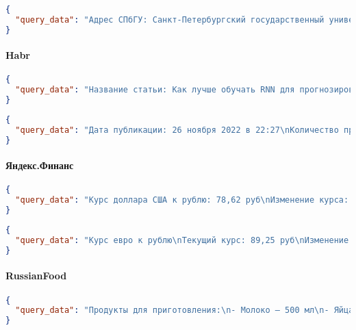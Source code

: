 \begin{lstlisting}[language=json,breaklines,keepspaces]
{
  "query_data": "Адрес СПбГУ: Санкт-Петербургский государственный университет, 199034, Россия, Санкт-Петербург, Университетская набережная, д. 7–9\n"
}
\end{lstlisting}

\paragraph{Habr}
\begin{lstlisting}[language=json,breaklines,keepspaces]
{
  "query_data": "Название статьи: Как лучше обучать RNN для прогнозирования временных рядов?\nАвтор: Lev_Perla\n"
}
\end{lstlisting}

\begin{lstlisting}[language=json,breaklines,keepspaces]
{
  "query_data": "Дата публикации: 26 ноября 2022 в 22:27\nКоличество просмотров: 22842\n"
}
\end{lstlisting}

\paragraph{Яндекс.Финанс}
\begin{lstlisting}[language=json,breaklines,keepspaces]
{
  "query_data": "Курс доллара США к рублю: 78,62 руб\nИзменение курса: Цена опустилась на −2,88 руб\nОтносительное изменение: −2,88 руб (3,53%)\nИсточник: ЦБ РФ\n"
}
\end{lstlisting}

\begin{lstlisting}[language=json,breaklines,keepspaces]
{
  "query_data": "Курс евро к рублю\nТекущий курс: 89,25 руб\nИзменение за день: −3,59 руб (3,86%)\nОбновлено: 31 мая 2025 г.\n"
}
\end{lstlisting}

\paragraph{RussianFood}
\begin{lstlisting}[language=json,breaklines,keepspaces]
{
  "query_data": "Продукты для приготовления:\n- Молоко — 500 мл\n- Яйца — 2–3 шт.\n- Масло растительное — 1 ст. ложка (для смазывания сковороды)\n- Мука — 200 г\n- Сахар — 1 ст. ложка\n- Соль — 1 щепотка\n- Масло сливочное — 1 ст. ложка (для смазывания)\n"
}
\end{lstlisting}

